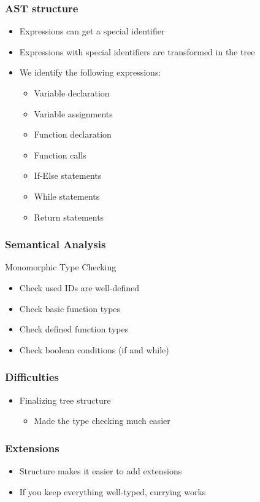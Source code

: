 \documentclass{beamer}
\begin{document}
\begin{frame}
\frametitle{AST structure}
\begin{itemize}
\item Expressions can get a special identifier
\item Expressions with special identifiers are transformed in the tree
\item We identify the following expressions:
\begin{itemize}
\item Variable declaration
\item Variable assignments
\item Function declaration
\item Function calls
\item If-Else statements
\item While statements
\item Return statements
\end{itemize}
\end{itemize}
\end{frame}

\begin{frame}
\frametitle{Semantical Analysis}
Monomorphic Type Checking
\begin{itemize}
\item Check used IDs are well-defined
\item Check basic function types
\item Check defined function types
\item Check boolean conditions (if and while)
\end{itemize}
\end{frame}

\begin{frame}
\frametitle{Difficulties}
\begin{itemize}
\item Finalizing tree structure
\begin{itemize}
\item Made the type checking much easier
\end{itemize}
\end{itemize}
\end{frame}

\begin{frame}
\frametitle{Extensions}
\begin{itemize}
\item Structure makes it easier to add extensions
\item If you keep everything well-typed, currying works
\end{itemize}
\end{frame}
\end{document}
